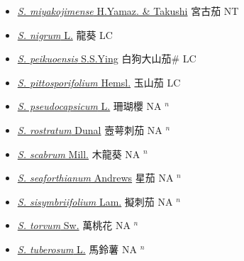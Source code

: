 \begin{itemize}
\begin{itemize}
        \item[] \href{http://www.theplantlist.org/tpl1.1/search?q=Solanum+miyakojimense}{\textit{S. miyakojimense} H.Yamaz. \& Takushi}   宮古茄 NT
        \item[] \href{http://www.theplantlist.org/tpl1.1/search?q=Solanum+nigrum}{\textit{S. nigrum} L.}   龍葵 LC
        \item[] \href{http://www.theplantlist.org/tpl1.1/search?q=Solanum+peikuoensis}{\textit{S. peikuoensis} S.S.Ying}   白狗大山茄\# LC
        \item[] \href{http://www.theplantlist.org/tpl1.1/search?q=Solanum+pittosporifolium}{\textit{S. pittosporifolium} Hemsl.}   玉山茄 LC
        \item[] \href{http://www.theplantlist.org/tpl1.1/search?q=Solanum+pseudocapsicum}{\textit{S. pseudocapsicum} L.}   珊瑚櫻 NA $^n$
        \item[] \href{http://www.theplantlist.org/tpl1.1/search?q=Solanum+rostratum}{\textit{S. rostratum} Dunal}   壼萼刺茄 NA $^n$
        \item[] \href{http://www.theplantlist.org/tpl1.1/search?q=Solanum+scabrum}{\textit{S. scabrum} Mill.}   木龍葵 NA $^n$
        \item[] \href{http://www.theplantlist.org/tpl1.1/search?q=Solanum+seaforthianum}{\textit{S. seaforthianum} Andrews}   星茄 NA $^n$
        \item[] \href{http://www.theplantlist.org/tpl1.1/search?q=Solanum+sisymbriifolium}{\textit{S. sisymbriifolium} Lam.}   擬刺茄 NA $^n$
        \item[] \href{http://www.theplantlist.org/tpl1.1/search?q=Solanum+torvum}{\textit{S. torvum} Sw.}   萬桃花 NA $^n$
        \item[] \href{http://www.theplantlist.org/tpl1.1/search?q=Solanum+tuberosum}{\textit{S. tuberosum} L.}   馬鈴薯 NA $^n$

\end{itemize}
\end{itemize}
